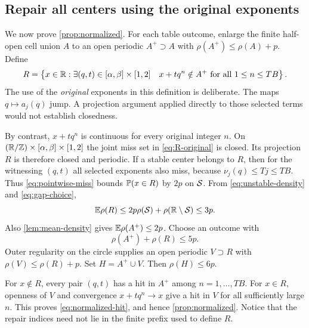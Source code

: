 \subsection{Repair all centers using the original exponents}

We now prove \cref{prop:normalized}. For each table outcome, enlarge
the finite half-open cell union $A$ to an open periodic $A^+\supset A$
with $\rho(A^+)\le\rho(A)+p$. Define
\begin{equation}\label{eq:R-original}
 R=\left\{x\in\mathbb R:\exists(q,t)\in[\alpha,\beta]\times[1,2]
   \quad x+tq^n\notin A^+\ \text{for all }1\le n\le TB\right\}.
\end{equation}
The use of the \emph{original} exponents in this definition is deliberate.
The maps $q\mapsto a_j(q)$ jump. A projection argument applied directly
to those selected terms would not establish closedness.

By contrast, $x+tq^n$ is continuous for every original integer $n$.
On $(\mathbb R/\mathbb Z)\times[\alpha,\beta]\times[1,2]$ the joint miss set
in \eqref{eq:R-original} is closed. Its projection $R$ is therefore
closed and periodic. If a stable center belongs to $R$, then for the
witnessing $(q,t)$ all selected exponents also miss, because
$\nu_j(q)\le Tj\le TB$. Thus \eqref{eq:pointwise-miss} bounds
$\mathbb P(x\in R)$ by $2p$ on $\mathcal S$. From
\eqref{eq:unstable-density} and \eqref{eq:gap-choice},
\begin{equation}\label{eq:expected-R}
 \mathbb E\rho(R)\le2p\rho(\mathcal S)+\rho(\mathbb R\setminus\mathcal S)\le3p.
\end{equation}
Also \cref{lem:mean-density} gives $\mathbb E\rho(A^+)\le2p$.
Choose an outcome with
\[
 \rho(A^+)+\rho(R)\le5p.
\]
Outer regularity on the circle supplies an open periodic $V\supset R$
with $\rho(V)\le\rho(R)+p$. Set $H=A^+\cup V$. Then
$\rho(H)\le6p$.

For $x\notin R$, every pair $(q,t)$ has a hit in $A^+$ among
$n=1,\ldots,TB$. For $x\in R$, openness of $V$ and convergence
$x+tq^n\to x$ give a hit in $V$ for all sufficiently large $n$.
This proves \eqref{eq:normalized-hit}, and hence
\cref{prop:normalized}. Notice that the repair indices need not lie
in the finite prefix used to define $R$.
